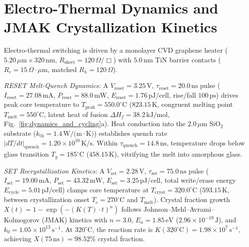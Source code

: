 \documentclass[letterpaper,10pt]{article}
\begin{document}
\section{Electro-Thermal Dynamics and JMAK Crystallization Kinetics}
Electro-thermal switching is driven by a monolayer CVD graphene heater ($5.20\,\mu\text{m} \times 320\,\text{nm}$, $R_{\text{sheet}} = 120\,\Omega/\Box$) with $5.0\,\text{nm}$ TiN barrier contacts ($R_c = 15\,\Omega\cdot\mu\text{m}$, matched $R_h = 120\,\Omega$).

\textit{RESET Melt-Quench Dynamics:} A $V_{\text{reset}} = 3.25\,\text{V}$, $\tau_{\text{reset}} = 20.0\,\text{ns}$ pulse ($I_{\text{reset}} = 27.08\,\text{mA}$, $P_{\text{reset}} = 88.0\,\text{mW}$, $E_{\text{reset}} = 1.76\,\text{pJ/cell}$, rise/fall $100\,\text{ps}$) drives peak core temperature to $T_{\text{peak}} = 550.0^\circ\text{C}$ ($823.15\,\text{K}$, congruent melting point $T_{\text{melt}} = 550^\circ\text{C}$, latent heat of fusion $\Delta H_f = 38.2\,\text{kJ/mol}$, Fig.~\ref{fig:dynamics_and_cycling}a). Heat conduction into the $2.0\,\mu\text{m}$ $\text{SiO}_2$ substrate ($k_{\text{th}} = 1.4\,\text{W/(m}\cdot\text{K)}$) establishes quench rate $|dT/dt|_{\text{quench}} = 1.20 \times 10^{10}\,\text{K/s}$. Within $\tau_{\text{quench}} = 14.8\,\text{ns}$, temperature drops below glass transition $T_g = 185^\circ\text{C}$ ($458.15\,\text{K}$), vitrifying the melt into amorphous glass.

\textit{SET Recrystallization Kinetics:} A $V_{\text{set}} = 2.28\,\text{V}$, $\tau_{\text{set}} = 75.0\,\text{ns}$ pulse ($I_{\text{set}} = 19.00\,\text{mA}$, $P_{\text{set}} = 43.32\,\text{mW}$, $E_{\text{set}} = 3.25\,\text{pJ/cell}$, total write/erase energy $E_{\text{cycle}} = 5.01\,\text{pJ/cell}$) clamps core temperature at $T_{\text{cryst}} = 320.0^\circ\text{C}$ ($593.15\,\text{K}$, between crystallization onset $T_c = 270^\circ\text{C}$ and $T_{\text{melt}}$). Crystal fraction growth $X(t) = 1 - \exp(-(K(T)\cdot t)^n)$ follows Johnson--Mehl--Avrami--Kolmogorov (JMAK) kinetics \cite{Avrami1939, JohnsonMehl1939} with $n = 3.0$, $E_a = 1.85\,\text{eV}$ ($2.96 \times 10^{-19}\,\text{J}$), and $k_0 = 1.05 \times 10^{13}\,\text{s}^{-1}$. At $320^\circ\text{C}$, the reaction rate is $K(320^\circ\text{C}) = 1.98 \times 10^7\,\text{s}^{-1}$, achieving $X(75\,\text{ns}) = 98.52\%$ crystal fraction.
\end{document}
